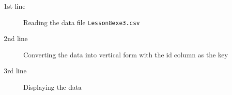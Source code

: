\begin{description}
	\item[1st line] Reading the data file \texttt{Lesson8exe3.csv}
	\item[2nd line] Converting the data into vertical form with the id column as the key
	\item[3rd line] Displaying the data
\end{description}
